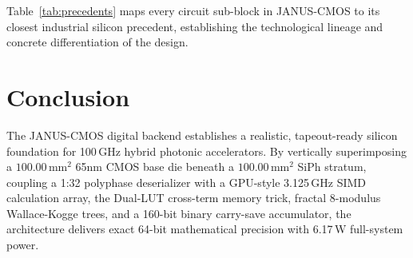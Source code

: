 \documentclass[10pt,journal,compsoc]{IEEEtran}
\begin{document}
Table~\ref{tab:precedents} maps every circuit sub-block in JANUS-CMOS to its closest industrial silicon precedent, establishing the technological lineage and concrete differentiation of the design.

\section{Conclusion}\label{sec:conclusion}
The JANUS-CMOS digital backend establishes a realistic, tapeout-ready silicon foundation for 100\,GHz hybrid photonic accelerators. By vertically superimposing a $100.00\,\text{mm}^2$ 65nm CMOS base die beneath a $100.00\,\text{mm}^2$ SiPh stratum, coupling a 1:32 polyphase deserializer with a GPU-style 3.125\,GHz SIMD calculation array, the Dual-LUT cross-term memory trick, fractal 8-modulus Wallace-Kogge trees, and a 160-bit binary carry-save accumulator, the architecture delivers exact 64-bit mathematical precision with 6.17\,W full-system power.



\end{document}
